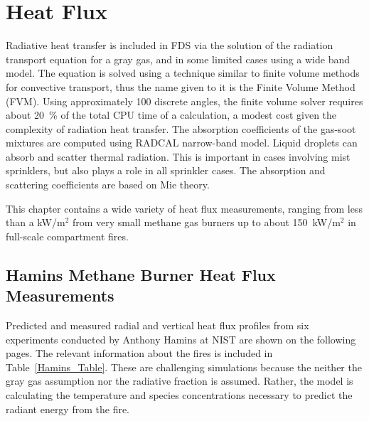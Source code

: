 \chapter{Heat Flux}

Radiative heat transfer is included in FDS via the solution of the radiation transport equation for a
gray gas, and in some limited cases using a wide band
model.  The equation is solved using a technique similar to finite
volume methods for convective transport, thus the name given to it is
the Finite Volume Method (FVM).  Using approximately 100 discrete
angles, the finite volume solver requires about 20~\% of the total CPU
time of a calculation, a modest cost given the complexity of radiation
heat transfer. The absorption coefficients of the gas-soot mixtures
are computed using RADCAL narrow-band model.  Liquid droplets can
absorb and scatter thermal radiation. This is important in cases
involving mist sprinklers, but also plays a role in all sprinkler
cases.  The absorption and scattering coefficients are based on Mie
theory.

This chapter contains a wide variety of heat flux measurements,
ranging from less than a kW/m$^2$ from very small methane gas burners
up to about 150~kW/m$^2$ in full-scale compartment fires.




\section{Hamins Methane Burner Heat Flux Measurements}

Predicted and measured radial and vertical heat flux profiles from six experiments conducted by Anthony Hamins at NIST are shown on the following pages. The
relevant information about the fires is included in Table~\ref{Hamins_Table}. These are challenging simulations because the neither the gray gas assumption
nor the radiative fraction is assumed. Rather, the model is calculating the temperature and species concentrations necessary to predict the radiant energy from the fire.

